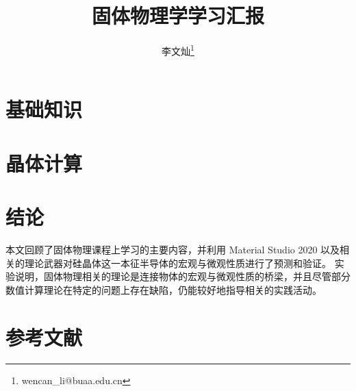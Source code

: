 \documentclass{ctexart}
\title{固体物理学学习汇报}
\author{李文灿\thanks{wencan\_li@buaa.edu.cn}}
\numberwithin{equation}{subsection}
\theoremstyle{definition}
\begin{document}
\maketitle
\tableofcontents
\clearpage

\section{基础知识}


\section{晶体计算}


\section{结论}
本文回顾了固体物理课程上学习的主要内容，并利用 Material Studio 2020 以及相关的理论武器对硅晶体这一本征半导体的宏观与微观性质进行了预测和验证。
实验说明，固体物理相关的理论是连接物体的宏观与微观性质的桥梁，并且尽管部分数值计算理论在特定的问题上存在缺陷，仍能较好地指导相关的实践活动。

\section{参考文献}
\nocite{*}
\printbibliography[heading=none]
\end{document}
